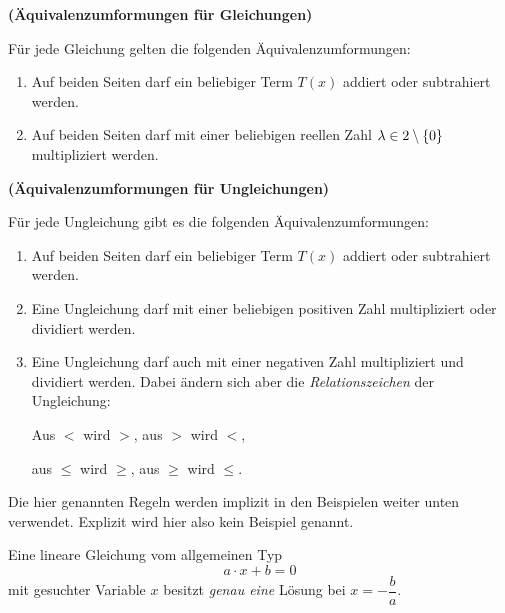 \documentclass[ngerman, 12pt]{nssheetxea}
\begin{document}

\begin{theorem}\textbf{(Äquivalenzumformungen für Gleichungen)} \par
Für jede Gleichung gelten die folgenden Äquivalenzumformungen:
\begin{enumerate}
\item Auf beiden Seiten darf ein beliebiger Term $T(x)$ addiert oder subtrahiert werden.
\item Auf beiden Seiten darf mit einer beliebigen reellen Zahl $\lambda \in 2 \setminus \{ 0 \}$ multipliziert werden.
\end{enumerate}
\end{theorem}

\begin{theorem}\textbf{(Äquivalenzumformungen für Ungleichungen)} \par
Für jede Ungleichung gibt es die folgenden Äquivalenzumformungen:
\begin{enumerate}
\item Auf beiden Seiten darf ein beliebiger Term $T(x)$ addiert oder subtrahiert werden.
\item Eine Ungleichung darf mit einer beliebigen positiven Zahl multipliziert oder dividiert werden.
\item Eine Ungleichung darf auch mit einer negativen Zahl multipliziert und dividiert werden. Dabei ändern sich aber die \textit{Relationszeichen} der Ungleichung:
\begin{center}
Aus $<$ wird $>$, \hspace{3cm}
aus $>$ wird $<$, \par
aus $\leq$ wird $\geq$, \hspace{3cm}
aus $\geq$ wird $\leq$.
\end{center}
\end{enumerate}
\end{theorem}

Die hier genannten Regeln werden implizit in den Beispielen weiter unten verwendet. Explizit wird hier also kein Beispiel genannt.

\begin{theorem}
Eine lineare Gleichung vom allgemeinen Typ
\[ a\cdot x + b = 0\]
mit gesuchter Variable $x$ besitzt \emph{genau eine} Lösung bei $x=-\dfrac{b}{a}$.
\end{theorem}
\end{document}
